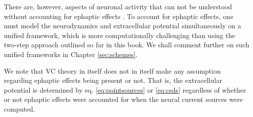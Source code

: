 There are, however, aspects of neuronal activity that can not be understood without accounting for ephaptic effects \cite{Holt1999, Anastassiou2015, Goldwyn2016}. To account for ephaptic effects, one must model the neurodynamics and extracellular potential simultaneously on a unified framework, which is more computationally challenging than using the two-step approach outlined so far in this book. We shall comment further on such unified frameworks in Chapter \ref{sec:schemes}.

We note that VC theory in itself does not in itself make any assumption regarding ephaptic effects being present or not. That is, the extracellular potential is determined by eq. \ref{eq:pointsources} or \ref{eq:csds} regardless of whether or not ephaptic effects were accounted for when the neural current sources were computed. 




